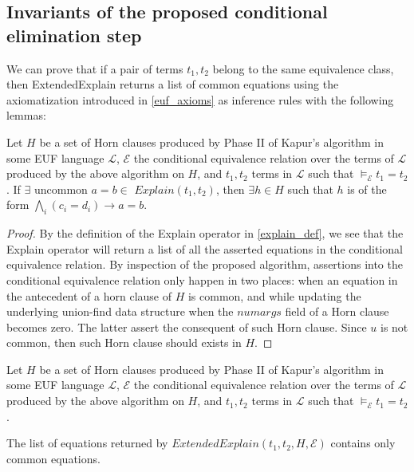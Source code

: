 \subsection{Invariants of the proposed
conditional elimination step}

We can prove that if a pair of terms $t_1, t_2$ belong
to the same equivalence class, then ExtendedExplain returns
a list of common equations 
using the axiomatization introduced in \ref{euf_axioms} as 
inference rules with the following lemmas:

\begin{lemma} \label{existence_horn_in_explain}
  Let $H$ be a set of Horn clauses produced by Phase II
  of Kapur's algorithm in some EUF language $\mathcal{L}$, 
  $\mathcal{E}$ the conditional 
  equivalence relation over the terms of 
  $\mathcal{L}$ produced by the above algorithm on $H$,
  and $t_1, t_2$ terms in 
  $\mathcal{L}$ such that
  $\models_{\mathcal{E}} t_1 = t_2$.
  If $\exists \text{ uncommon } a = b \in$
  $Explain(t_1, t_2)$, then $\exists h \in H$ such 
  that $h$ is of the form 
  $\bigwedge_i (c_i = d_i) \rightarrow a = b$.
\end{lemma}

\begin{proof}
  By the definition of the Explain operator in \ref{explain_def},
  we see that the Explain operator will return a
  list of all the asserted equations in the conditional
  equivalence relation. By inspection of the proposed
  algorithm, assertions into the conditional equivalence
  relation only happen in two places: when an equation 
  in the antecedent of a horn clause of $H$ is common, 
  and while updating the underlying union-find data structure
  when the $numargs$ field of a Horn clause becomes
  zero. The latter assert the consequent of such Horn clause.
  Since $u$ is not common, then such Horn clause 
  should exists in $H$.
\end{proof}

\begin{lemma}\label{extended_explain_common_lemma}

  Let $H$ be a set of Horn clauses produced by Phase II
  of Kapur's algorithm in some EUF language 
  $\mathcal{L}$, $\mathcal{E}$ the conditional 
  equivalence relation over the terms of 
  $\mathcal{L}$ produced by the above algorithm on $H$,
  and $t_1, t_2$ terms in 
  $\mathcal{L}$ such that
  $\models_{\mathcal{E}} t_1 = t_2$.

  The list of equations returned by $ExtendedExplain(t_1, t_2, 
  H, \mathcal{E})$ contains only common equations.
\end{lemma}

